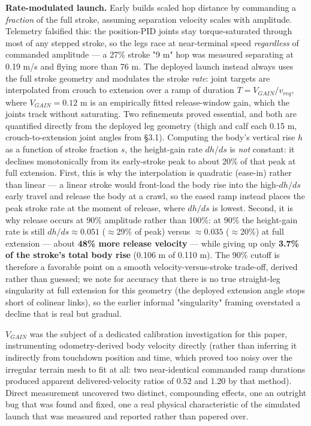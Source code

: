 \documentclass[conference]{IEEEtran}
\begin{document}
\textbf{Rate-modulated launch.} Early builds scaled hop distance by commanding a \emph{fraction} of the full stroke, assuming separation velocity scales with amplitude. Telemetry falsified this: the position-PID joints stay torque-saturated through most of any stepped stroke, so the legs race at near-terminal speed \emph{regardless} of commanded amplitude --- a 27\% stroke "9 m" hop was measured separating at 0.19 m/s and flying more than 76 m. The deployed launch instead always uses the full stroke geometry and modulates the stroke \emph{rate}: joint targets are interpolated from crouch to extension over a ramp of duration $T = V_{GAIN}/v_{req}$, where $V_{GAIN} = 0.12$ m is an empirically fitted release-window gain, which the joints track without saturating. Two refinements proved essential, and both are quantified directly from the deployed leg geometry (thigh and calf each 0.15 m, crouch-to-extension joint angles from \S3.1). Computing the body's vertical rise $h$ as a function of stroke fraction $s$, the height-gain rate $dh/ds$ is \emph{not} constant: it declines monotonically from its early-stroke peak to about 20\% of that peak at full extension. First, this is why the interpolation is quadratic (ease-in) rather than linear --- a linear stroke would front-load the body rise into the high-$dh/ds$ early travel and release the body at a crawl, so the eased ramp instead places the peak stroke rate at the moment of release, where $dh/ds$ is lowest. Second, it is why release occurs at 90\% amplitude rather than 100\%: at 90\% the height-gain rate is still $dh/ds \approx 0.051$ (\ensuremath{\approx}29\% of peak) versus $\approx 0.035$ (\ensuremath{\approx}20\%) at full extension --- about \textbf{48\% more release velocity} --- while giving up only \textbf{3.7\% of the stroke's total body rise} (0.106 m of 0.110 m). The 90\% cutoff is therefore a favorable point on a smooth velocity-versus-stroke trade-off, derived rather than guessed; we note for accuracy that there is no true straight-leg singularity at full extension for this geometry (the deployed extension angle stops short of colinear links), so the earlier informal "singularity" framing overstated a decline that is real but gradual.

$V_{GAIN}$ was the subject of a dedicated calibration investigation for this paper, instrumenting odometry-derived body velocity directly (rather than inferring it indirectly from touchdown position and time, which proved too noisy over the irregular terrain mesh to fit at all: two near-identical commanded ramp durations produced apparent delivered-velocity ratios of 0.52 and 1.20 by that method). Direct measurement uncovered two distinct, compounding effects, one an outright bug that was found and fixed, one a real physical characteristic of the simulated launch that was measured and reported rather than papered over.
\end{document}
